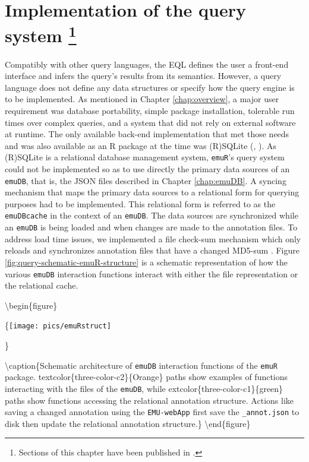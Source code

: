 \documentclass[]{book}
\begin{document}
\hypertarget{chap:querysys-impl}{%
\chapter[Implementation of the query system ]{\texorpdfstring{Implementation of the query system \footnote{Sections of this chapter have been published in \citet{winkelmann:2017aa}.}}{Implementation of the query system }}\label{chap:querysys-impl}}

Compatibly with other query languages, the EQL defines the user a front-end interface and infers the query's results from its semantics. However, a query language does not define any data structures or specify how the query engine is to be implemented. As mentioned in Chapter \ref{chap:overview}, a major user requirement was database portability, simple package installation, tolerable run times over complex queries, and a system that did not rely on external software at runtime. The only available back-end implementation that met those needs and was also available as an R package at the time was (R)SQLite (\citet{hipp:2007a}, \citet{wickham:2014a}). As (R)SQLite is a relational database management system, \texttt{emuR}'s query system could not be implemented so as to use directly the primary data sources of an \texttt{emuDB}, that is, the JSON files described in Chapter \ref{chap:emuDB}. A syncing mechanism that maps the primary data sources to a relational form for querying purposes had to be implemented. This relational form is referred to as the \texttt{emuDBcache} in the context of an \texttt{emuDB}. The data sources are synchronized while an \texttt{emuDB} is being loaded and when changes are made to the annotation files. To address load time issues, we implemented a file check-sum mechanism which only reloads and synchronizes annotation files that have a changed MD5-sum \citep{rivest:1992a}. Figure \ref{fig:query-schematic-emuR-structure} is a schematic representation of how the various \texttt{emuDB} interaction functions interact with either the file representation or the relational cache.

\textbackslash{}begin\{figure\}

\{\centering \texttt{[image: pics/emuRstruct]}

\}

\textbackslash{}caption\{Schematic architecture of \texttt{emuDB} interaction functions of the \texttt{emuR} package. textcolor\{three-color-c2\}\{Orange\} paths show examples of functions interacting with the files of the \texttt{emuDB}, while extcolor\{three-color-c1\}\{green\} paths show functions accessing the relational annotation structure. Actions like saving a changed annotation using the \texttt{EMU-webApp} first save the \texttt{\_annot.json} to disk then update the relational annotation structure.\}\label{fig:query-schematic-emuR-structure}
\textbackslash{}end\{figure\}
\end{document}
